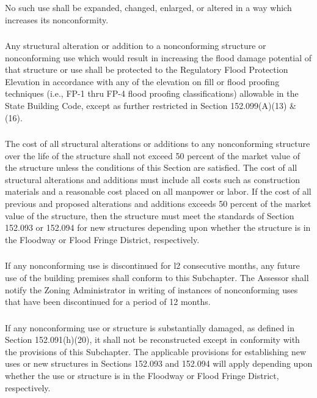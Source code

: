 \subsubsection{}
No such use shall be expanded, changed, enlarged, or altered in a way which increases its nonconformity.
\subsubsection{}
Any structural alteration or addition to a nonconforming structure or nonconforming use which would result in increasing the flood damage potential of that structure or use shall be protected to the Regulatory Flood Protection Elevation in accordance with any of the elevation on fill or flood proofing techniques (i.e., FP-1 thru FP-4 flood proofing classifications) allowable in the State Building Code, except as further restricted in Section 152.099(A)(13) \& (16).
\subsubsection{}
The cost of all structural alterations or additions to any nonconforming structure over the life of the structure shall not exceed 50 percent of the market value of the structure unless the conditions of this Section are satisfied. The cost of all structural alterations and additions must include all costs such as construction materials and a reasonable cost placed on all manpower or labor. If the cost of all previous and proposed alterations and additions exceeds 50 percent of the market value of the structure, then the structure must meet the standards of Section 152.093 or 152.094 for new structures depending upon whether the structure is in the Floodway or Flood Fringe District, respectively.
\subsubsection{}
If any nonconforming use is discontinued for l2 consecutive months, any future use of the building premises shall conform to this Subchapter. The Assessor shall notify the Zoning Administrator in writing of instances of nonconforming uses that have been discontinued for a period of 12 months.
\subsubsection{}
If any nonconforming use or structure is substantially damaged, as defined in Section 152.091(h)(20), it shall not be reconstructed except in conformity with the provisions of this Subchapter. The applicable provisions for establishing new uses or new structures in Sections 152.093 and 152.094 will apply depending upon whether the use or structure is in the Floodway or Flood Fringe District, respectively.
